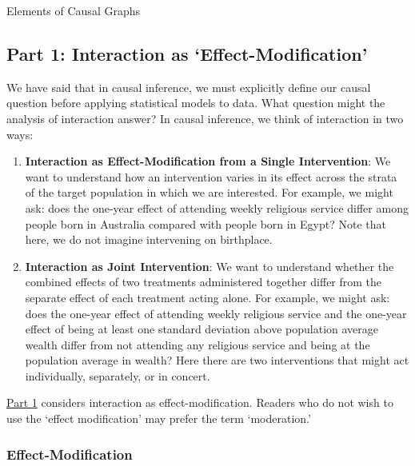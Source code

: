 \documentclass[
  single column]{article}
\begin{document}
\begin{table}

\caption{\label{tbl-terminologydirectedgraph}Elements of Causal Graphs}

\centering{

\terminologydirectedgraph

}

\end{table}%

\newpage{}

\subsection{Part 1: Interaction as
`Effect-Modification'}\label{id-sec-1}

We have said that in causal inference, we must explicitly define our
causal question before applying statistical models to data. What
question might the analysis of interaction answer? In causal inference,
we think of interaction in two ways:

\begin{enumerate}
\def\labelenumi{\arabic{enumi}.}
\item
  \textbf{Interaction as Effect-Modification from a Single
  Intervention}: We want to understand how an intervention varies in its
  effect across the strata of the target population in which we are
  interested. For example, we might ask: does the one-year effect of
  attending weekly religious service differ among people born in
  Australia compared with people born in Egypt? Note that here, we do
  not imagine intervening on birthplace.
\item
  \textbf{Interaction as Joint Intervention}: We want to understand
  whether the combined effects of two treatments administered together
  differ from the separate effect of each treatment acting alone. For
  example, we might ask: does the one-year effect of attending weekly
  religious service and the one-year effect of being at least one
  standard deviation above population average wealth differ from not
  attending any religious service and being at the population average in
  wealth? Here there are two interventions that might act individually,
  separately, or in concert.
\end{enumerate}

\hyperref[id-sec-1]{Part 1} considers interaction as
effect-modification. Readers who do not wish to use the `effect
modification' may prefer the term `moderation.'

\subsubsection{Effect-Modification}\label{effect-modification}
\end{document}

